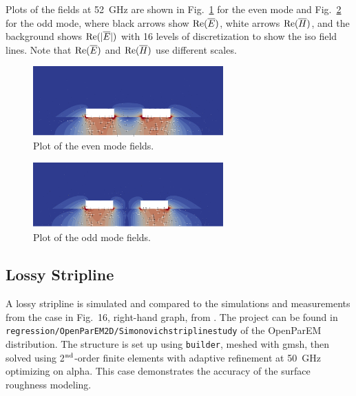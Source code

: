 \documentclass[titlepage]{article}
\renewcommand\_{\textunderscore\linebreak[1]}
\begin{document}
Plots of the fields at 52~GHz are shown in Fig.~\ref{fig:diffpair_even_plot} for the even mode and Fig.~\ref{fig:diffpair_odd_plot} for the odd mode, where black arrows show $\textnormal{Re}(\overline{E})$, white arrows $\textnormal{Re}(\overline{H})$, and the background shows $\textnormal{Re}(|\overline{E}|)$ with 16 levels of discretization to show the iso field lines.  Note that $\textnormal{Re}(\overline{E})$ and $\textnormal{Re}(\overline{H})$ use different scales.
\begin{figure}[H]
  \centering
  \includegraphics[width=0.65\textwidth]{../regression/OpenParEM2D/differential_pair/diff_pair_study/screenshots/diffpair_even_plot}
  \caption{Plot of the even mode fields.}
  \label{fig:diffpair_even_plot}
\end{figure}
\begin{figure}[H]
  \centering
  \includegraphics[width=0.65\textwidth]{../regression/OpenParEM2D/differential_pair/diff_pair_study/screenshots/diffpair_odd_plot}
  \caption{Plot of the odd mode fields.}
  \label{fig:diffpair_odd_plot}
\end{figure}

\subsection{Lossy Stripline}

A lossy stripline is simulated and compared to the simulations and measurements from the case in Fig.~16, right-hand graph, from \cite{Simonovich}.  The project can be found in \texttt{regression/OpenParEM2D/Simonovich\_stripline\_study} of the OpenParEM distribution.  The structure is set up using \texttt{builder}, meshed with gmsh, then solved using 2$^{\textnormal{nd}}$-order finite elements with adaptive refinement at 50~GHz optimizing on alpha.  This case demonstrates the accuracy of the surface roughness modeling.
\end{document}
